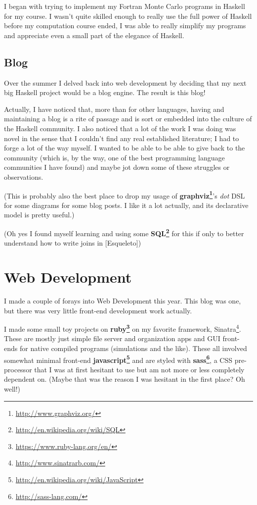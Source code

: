 \documentclass[]{article}
\renewcommand{\href}[2]{#2\footnote{\url{#1}}}
\begin{document}
I began with trying to implement my Fortran Monte Carlo programs in Haskell for
my course. I wasn't quite skilled enough to really use the full power of Haskell
before my computation course ended, I was able to really simplify my programs
and appreciate even a small part of the elegance of Haskell.

\subsection{Blog}

Over the summer I delved back into web development by deciding that my next big
Haskell project would be a blog engine. The result is this blog!

Actually, I have noticed that, more than for other languages, having and
maintaining a blog is a rite of passage and is sort or embedded into the culture
of the Haskell community. I also noticed that a lot of the work I was doing was
novel in the sense that I couldn't find any real established literature; I had
to forge a lot of the way myself. I wanted to be able to be able to give back to
the community (which is, by the way, one of the best programming language
communities I have found) and maybe jot down some of these struggles or
observations.

(This is probably also the best place to drop my usage of
\textbf{\href{http://www.graphviz.org/}{graphviz}}'s \emph{dot} DSL for some
diagrams for some blog posts. I like it a lot actually, and its declarative
model is pretty useful.)

(Oh yes I found myself learning and using some
\textbf{\href{http://en.wikipedia.org/wiki/SQL}{SQL}} for this if only to better
understand how to write joins in {[}Esqueleto{]})

\section{Web Development}

I made a couple of forays into Web Development this year. This blog was one, but
there was very little front-end development work actually.

I made some small toy projects on
\textbf{\href{https://www.ruby-lang.org/en/}{ruby}} on my favorite framework,
\href{http://www.sinatrarb.com/}{Sinatra}. These are mostly just simple file
server and organization apps and GUI front-ends for native compiled programs
(simulations and the like). These all involved somewhat minimal front-end
\textbf{\href{http://en.wikipedia.org/wiki/JavaScript}{javascript}} and are
styled with \textbf{\href{http://sass-lang.com/}{sass}}, a CSS pre-processor
that I was at first hesitant to use but am not more or less completely dependent
on. (Maybe that was the reason I was hesitant in the first place? Oh well!)
\end{document}
